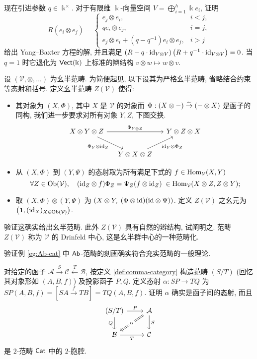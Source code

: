 \begin{Exercises}
		现在引进参数 $q \in \Bbbk^\times$. 对于有限维 $\Bbbk$-向量空间 $V = \bigoplus_{i=1}^h \Bbbk e_i$, 证明
		\[ R(e_i \otimes e_j) = \begin{cases}
			e_j \otimes e_i, & i < j, \\
			q e_i \otimes e_j, & i = j, \\
			e_j \otimes e_i + (q - q^{-1}) e_i \otimes e_j, & i > j
		\end{cases} \]
		给出 Yang--Baxter 方程的解, 并且满足 $\left( R - q \cdot \mathrm{id}_{V \otimes V} \right) \left( R + q^{-1} \cdot \mathrm{id}_{V \otimes V} \right) = 0$. 当 $q=1$ 时它退化为 $\mathsf{Vect}(\Bbbk)$ 上标准的辫结构 $v \otimes w \mapsto w \otimes v$. 
	\item 设 $(\mathcal{V}, \otimes, \ldots)$ 为幺半范畴. 为简便起见, 以下设其为严格幺半范畴, 省略结合约束等态射和括号. 定义幺半范畴 $Z(\mathcal{V})$ 使得:
		\begin{itemize}
			\item 其对象为 $(X, \Phi)$, 其中 $X$ 是 $\mathcal{V}$ 的对象而 $\Phi: (X \otimes -) \stackrel{\sim}{\rightarrow} (- \otimes X)$ 是函子的同构, 我们进一步要求对所有对象 $Y,Z$, 下图交换.
				\[\begin{tikzcd}[column sep=small]
					X \otimes Y \otimes Z \arrow[rr, "\Phi_{Y \otimes Z}"] \arrow[rd, "{\Phi_Y \otimes \identity_Z}"'] & & Y \otimes Z \otimes X \\
					&  Y \otimes X \otimes Z \arrow[ru, "{\identity_Y \otimes \Phi_Z}"'] &
				\end{tikzcd}\]
			\item 从 $(X, \Phi)$ 到 $(Y, \Psi)$ 的态射取为所有满足下式的 $f \in \operatorname{Hom}_{\mathcal{V}}(X,Y)$
				\[ \forall Z \in \operatorname{Ob}(\mathcal{V}),\quad (\mathrm{id}_Z \otimes f) \Phi_Z = \Psi_Z (f \otimes \mathrm{id}_Z) \; \in \operatorname{Hom}_{\mathcal{V}}(X \otimes Z, Z \otimes Y); \]
			\item 取 $(X, \Phi) \otimes (Y, \Psi)$ 为 $(X \otimes Y,\; (\Phi \otimes \mathrm{id})(\mathrm{id} \otimes \Psi))$. 定义 $Z(\mathcal{V})$ 之幺元为 $\left(\mathbf{1}, (\mathrm{id}_X)_{X \in \operatorname{Ob}(\mathcal{V})}\right)$.
		\end{itemize}
		验证这确实给出幺半范畴. 此外 $Z(\mathcal{V})$ 具有自然的辫结构, 试阐明之. 范畴 $Z(\mathcal{V})$ 称为 $\mathcal{V}$ 的 Drinfeld 中心, 这是幺半群中心的一种范畴化.
	\item 验证例 \ref{eg:Ab-cat} 中 $\mathsf{Ab}$-范畴的刻画确实符合充实范畴的一般理论.
	\item 对给定的函子 $\mathcal{A} \xrightarrow{S} \mathcal{C} \xleftarrow{T} \mathcal{B}$, 按定义 \ref{def:comma-category} 构造范畴 $(S/T)$ (回忆其对象形如 $(A,B,f)$) 及投影函子 $P,Q$. 定义态射 $\alpha: SP \to TQ$ 为 $SP(A,B,f) = \left[ SA \xrightarrow{f} TB \right] = TQ(A,B,f)$. 证明 $\alpha$ 确实是函子间的态射, 而且
		\[\begin{tikzcd}
			(S/T) \arrow[r, "P"] \arrow[d, "Q"'] & \mathcal{A} \arrow[d, "S"] \arrow[Rightarrow, ld, "\alpha" description] \\
			\mathcal{B} \arrow[r, "T"'] & \mathcal{C}
		\end{tikzcd}\]
		是 $2$-范畴 $\mathsf{Cat}$ 中的 $2$-胞腔.
\end{Exercises}
